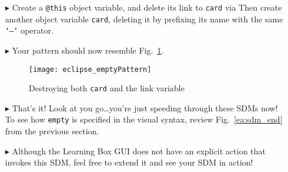 \begin{itemize}
\item[$\blacktriangleright$] Create a \texttt{@this} object variable, and delete its link to \texttt{card} via  Then create another
object variable \texttt{card}, deleting it by prefixing its name with the same \texttt{`--'} operator.

\vspace{0.5cm}

\item[$\blacktriangleright$] Your pattern should now resemble Fig.~\ref{eclipse:emptyPattern}.

\vspace{0.5cm}

\begin{figure}[htpb]
\begin{center}
  \texttt{[image: eclipse\_emptyPattern]}
  \caption{Destroying both \texttt{card} and the link variable}
  \label{eclipse:emptyPattern}
\end{center}
\end{figure}

\vspace{0.5cm}

\item[$\blacktriangleright$] That's it! Look at you go\ldots you're just speeding through these SDMs now! To see how \texttt{empty} is specified in the visual
syntax, review Fig.~\ref{ea:sdm_end} from the previous section.

\vspace{0.5cm}

\item[$\blacktriangleright$] Although the Learning Box GUI does not have an explicit action that invokes this SDM, feel free to extend it and see your SDM in
action!

\end{itemize}

